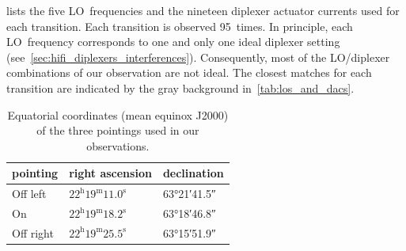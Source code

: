  lists the five LO~frequencies and the nineteen diplexer actuator currents used for each transition.
Each transition is observed 95~times.
In principle, each LO~frequency corresponds to one and only one ideal diplexer setting
(see~\cref{sec:hifi_diplexers_interferences}).
Consequently, most of the LO/diplexer combinations of our observation are not ideal.
The closest matches for each  transition are indicated by the gray background in~\cref{tab:los_and_dacs}.

\begin{table}[b]
%
    \centering
    \begin{tabular}{lll}
        \toprule
        pointing  & right ascension & declination \\
        \midrule
        Off left  & $22^\text{h}19^\text{m}11.0^\text{s}$ & \ang{63;21;41.5}\\
        On        & $22^\text{h}19^\text{m}18.2^\text{s}$ & \ang{63;18;46.8}\\
        Off right & $22^\text{h}19^\text{m}25.5^\text{s}$ & \ang{63;15;51.9}\\
        \bottomrule
    \end{tabular}
    \caption{Equatorial coordinates (mean equinox J2000) of the three pointings used in our observations.}
    \label{tab:on_off_positions}
\end{table}

